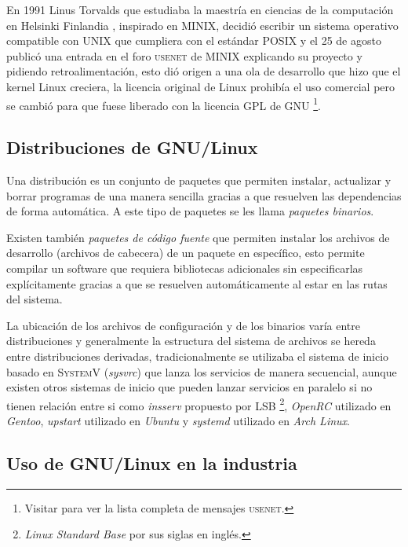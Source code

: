 En 1991 Linus Torvalds que estudiaba la maestr\'{i}a en ciencias de la computaci\'{o}n en Helsinki Finlandia \cite{_staff_????}, inspirado en \textsc{MINIX}, decidi\'{o} escribir un sistema operativo compatible con UNIX que cumpliera con el est\'{a}ndar \textsc{POSIX} y el 25 de agosto public\'{o} una entrada en el foro \textsc{usenet} de \textsc{MINIX} \cite{_history_????} explicando su proyecto y pidiendo retroalimentaci\'{o}n, esto di\'{o} origen a una ola de desarrollo que hizo que el kernel Linux creciera, la licencia original de Linux prohib\'{i}a el uso comercial pero se cambi\'{o} para que fuese liberado con la licencia \textsc{GPL} de \textsc{GNU} \cite{_linux_????-3} \footnote{Visitar \cite{_linuxs_????} para ver la lista completa de mensajes \textsc{usenet}.}.

  \subsection {Distribuciones de GNU/Linux}

Una distribuci\'{o}n es un conjunto de paquetes que permiten instalar, actualizar y borrar programas de una manera sencilla gracias a que resuelven las dependencias de forma autom\'{a}tica. A este tipo de paquetes se les llama \textit{paquetes binarios}.

Existen tambi\'{e}n \textit{paquetes de c\'{o}digo fuente} que permiten instalar los archivos de desarrollo (archivos de cabecera) de un paquete en espec\'{i}fico, esto permite compilar un software que requiera bibliotecas adicionales sin especificarlas expl\'{i}citamente gracias a que se resuelven autom\'{a}ticamente al estar en las rutas del sistema.

La ubicaci\'{o}n de los archivos de configuraci\'{o}n y de los binarios var\'{i}a entre distribuciones y generalmente la estructura del sistema de archivos se hereda entre distribuciones derivadas, tradicionalmente se utilizaba el sistema de inicio basado en \textsc{SystemV} (\textit{sysvrc}) que lanza los servicios de manera secuencial, aunque existen otros sistemas de inicio que pueden lanzar servicios en paralelo si no tienen relaci\'{o}n entre si como \textit{insserv} propuesto por \textsc{LSB} \footnote{\textit{Linux Standard Base} por sus siglas en ingl\'{e}s.}, \textit{OpenRC} utilizado en \textit{Gentoo}, \textit{upstart} utilizado en \textit{Ubuntu} y \textit{systemd} utilizado en \textit{Arch Linux}.

  \subsection {Uso de GNU/Linux en la industria}

